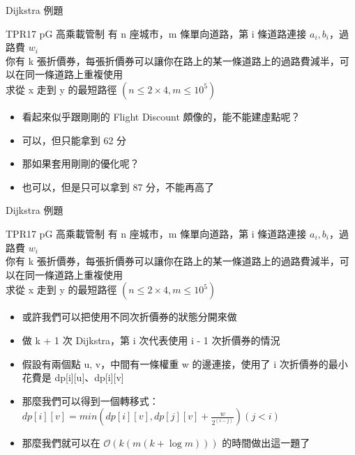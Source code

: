\documentclass[aspectratio=169]{beamer}
\begin{document}
    \begin{frame}{Dijkstra 例題}
        \begin{block}{TPR17 pG 高乘載管制}
            有 n 座城市，m 條單向道路，第 i 條道路連接 $a_i, b_i$，過路費 $w_i$\\
            你有 k 張折價券，每張折價券可以讓你在路上的某一條道路上的過路費減半，可以在同一條道路上重複使用\\
            求從 x 走到 y 的最短路徑 $(n \le 2 \times 4, m \le 10^5)$
        \end{block}

        \begin{itemize}
            \item<2-> 看起來似乎跟剛剛的 Flight Discount 頗像的，能不能建虛點呢？
            \item<3-> 可以，但只能拿到 62 分
            \item<4-> 那如果套用剛剛的優化呢？
            \item<5-> 也可以，但是只可以拿到 87 分，不能再高了
        \end{itemize}
    \end{frame}

    \begin{frame}{Dijkstra 例題}
        \begin{block}{TPR17 pG 高乘載管制}
            有 n 座城市，m 條單向道路，第 i 條道路連接 $a_i, b_i$，過路費 $w_i$\\
            你有 k 張折價券，每張折價券可以讓你在路上的某一條道路上的過路費減半，可以在同一條道路上重複使用\\
            求從 x 走到 y 的最短路徑 $(n \le 2 \times 4, m \le 10^5)$
        \end{block}

        \begin{itemize}
            \item<1-> 或許我們可以把使用不同次折價券的狀態分開來做
            \item<2-> 做 k + 1 次 Dijkstra，第 i 次代表使用 i - 1 次折價券的情況
            \item<3-> 假設有兩個點 u, v，中間有一條權重 w 的邊連接，使用了 i 次折價券的最小花費是 dp[i][u]、dp[i][v]
            \item<4-> 那麼我們可以得到一個轉移式：$dp[i][v] = min(dp[i][v], dp[j][v] + \frac{w}{2 ^ (i-j)}) (j < i)$
            \item<5-> 那麼我們就可以在 $\mathcal{O}(k (m (k + \log m)))$ 的時間做出這一題了
        \end{itemize}
    \end{frame}
\end{document}
